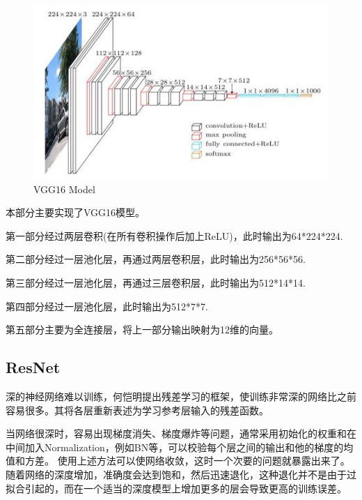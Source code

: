 \documentclass{article}
\begin{document}
\begin{figure}[H]
    \begin{center}
        \includegraphics[width=12cm]{figures/VGG16Model.jpg}
        \caption{VGG16 Model}
        \label{fig:1}
    \end{center}
\end{figure}
\par
本部分主要实现了VGG16模型\cite{simonyan2014very}。\par 
第一部分经过两层卷积(在所有卷积操作后加上ReLU)，此时输出为64*224*224.\par
第二部分经过一层池化层，再通过两层卷积层，此时输出为256*56*56.\par
第三部分经过一层池化层，再通过三层卷积层，此时输出为512*14*14.\par
第四部分经过一层池化层，此时输出为512*7*7.\par 
第五部分主要为全连接层，将上一部分输出映射为12维的向量。\par


\subsection{ResNet}

深的神经网络难以训练，何恺明提出残差学习\cite{he2016deep}的框架，使训练非常深的网络比之前容易很多。其将各层重新表述为学习参考层输入的残差函数。\par 

当网络很深时，容易出现梯度消失、梯度爆炸等问题，通常采用初始化的权重和在中间加入Normalization，例如BN等，可以校验每个层之间的输出和他的梯度的均值和方差。
使用上述方法可以使网络收敛，这时一个次要的问题就暴露出来了。随着网络的深度增加，准确度会达到饱和，然后迅速退化，这种退化并不是由于过拟合引起的，而在一个适当的深度模型上增加更多的层会导致更高的训练误差。\par
\end{document}
